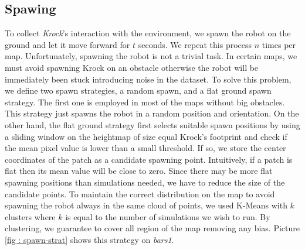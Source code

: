\documentclass[../document.tex]{subfiles}
\begin{document}
\subsection{Spawing}
To collect \emph{Krock}'s interaction with the environment, we spawn the robot on the ground and let it move forward for $t$ seconds. We repeat this process $n$ times per map.
    Unfortunately, spawning the robot is not a trivial task. In certain maps, we must avoid spawning Krock on an obstacle otherwise the robot will be immediately been stuck introducing noise in the dataset. To solve this problem, we define two spawn strategies, a random spawn, and a flat ground spawn strategy. The first one is employed in most of the maps without big obstacles. This strategy just spawns the robot in a random position and orientation. 
    On the other hand, the flat ground strategy first selects suitable spawn positions by using a sliding window on the heightmap of size equal Krock's footprint and check if the mean pixel value is lower than a small threshold. If so, we store the center coordinates of the patch as a candidate spawning point. Intuitively, if a patch is flat then its mean value will be close to zero.
Since there may be more flat spawning positions than simulations needed, we have to reduce the size of the candidate points. To maintain the correct distribution on the map to avoid spawning the robot always in the same cloud of points, we used K-Means with $k$ clusters where $k$ is equal to the number of simulations we wish to run. By clustering, we guarantee to cover all region of the map removing any bias. Picture \ref{fig : spawn-strat} shows this strategy on \emph{bars1}. 
\end{document}
